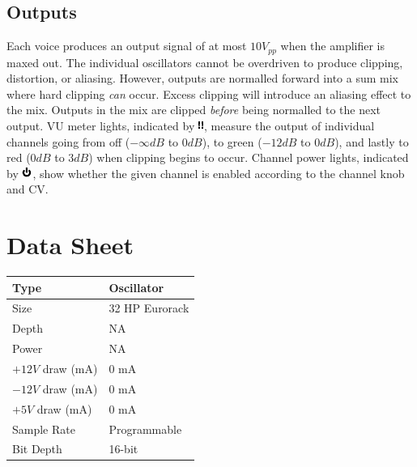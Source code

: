 \documentclass[12pt,letter]{article}
\begin{document}
\subsection{Outputs}

Each voice produces an output signal of at most $10V_{pp}$ when the amplifier is maxed out. The individual oscillators cannot be overdriven to produce clipping, distortion, or aliasing. However, outputs are normalled forward into a sum mix where hard clipping \textit{can} occur. Excess clipping will introduce an aliasing effect to the mix. Outputs in the mix are clipped \textit{before} being normalled to the next output. VU meter lights, indicated by \includegraphics[height=\baselineskip]{img/VU}, measure the output of individual channels going from off ($-\infty dB$ to $0dB$), to green ($-12dB$ to $0dB$), and lastly to red ($0dB$ to $3dB$) when clipping begins to occur. Channel power lights, indicated by \includegraphics[height=\baselineskip]{img/OnOff}, show whether the given channel is enabled according to the channel knob and CV.


\clearpage
\section{Data Sheet}

\begin{table}[!htp]
\begin{tabular}{|l|l|}
\hline
Type             & Oscillator               \\
\hline
Size             & 32 HP Eurorack           \\
\hline
Depth            & NA                       \\
\hline
Power            & NA                       \\ %
\hline
$+12V$ draw (mA) & 0 mA                     \\
\hline
$-12V$ draw (mA) & 0 mA                     \\
\hline
$+5V$ draw (mA)  & 0 mA                     \\
\hline
Sample Rate      & Programmable             \\
\hline
Bit Depth        & 16-bit                   \\
\hline
\end{tabular}
\end{table}


\clearpage
\renewcommand\refname{References \& Acknowledgments}
\nocite{*}


\end{document}
